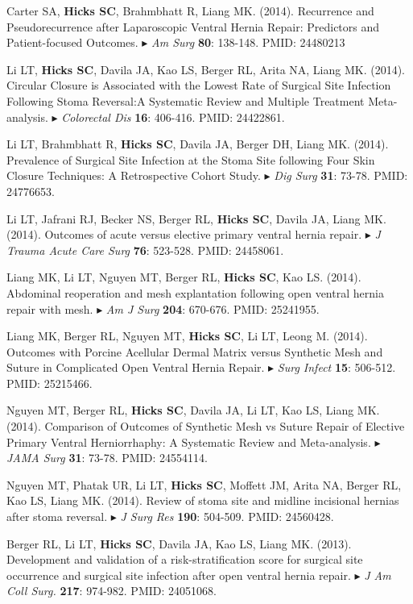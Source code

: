 \documentclass[10pt]{article}
\newcommand{\dg}[1]{{\color{black} $\blacktriangleright$ {#1}}}
\begin{document}
\item Carter SA, {\bf Hicks SC}, Brahmbhatt R, Liang MK. (2014). Recurrence and Pseudorecurrence after Laparoscopic Ventral Hernia Repair: Predictors and Patient-focused Outcomes. \dg{{\it Am Surg} {\bf 80}: 138-148. PMID: 24480213}
\item Li LT, {\bf Hicks SC}, Davila JA, Kao LS, Berger RL, Arita NA, Liang MK. (2014). Circular Closure is Associated with the Lowest Rate of Surgical Site Infection Following Stoma Reversal:A Systematic Review and Multiple Treatment Meta-analysis. \dg{{\it Colorectal Dis} {\bf 16}: 406-416. PMID: 24422861}.
\item Li LT, Brahmbhatt R, {\bf Hicks SC}, Davila JA, Berger DH, Liang MK. (2014). Prevalence of Surgical Site Infection at the Stoma Site following Four Skin Closure Techniques: A Retrospective Cohort Study. \dg{{\it Dig Surg} {\bf 31}: 73-78. PMID: 24776653}.
\item Li LT, Jafrani RJ, Becker NS, Berger RL,  {\bf Hicks SC}, Davila JA, Liang MK. (2014). Outcomes of acute versus elective primary ventral hernia repair. \dg{{\it J Trauma Acute Care Surg} {\bf 76}: 523-528. PMID: 24458061}.
\item Liang MK, Li LT, Nguyen MT, Berger RL, {\bf Hicks SC}, Kao LS. (2014). Abdominal reoperation and mesh explantation following open ventral hernia repair with mesh. \dg{{\it Am J Surg} {\bf 204}: 670-676. PMID: 25241955}.
\item Liang MK, Berger RL, Nguyen MT, {\bf Hicks SC}, Li LT, Leong M. (2014). Outcomes with Porcine Acellular Dermal Matrix versus Synthetic Mesh and Suture in Complicated Open Ventral Hernia Repair. \dg{{\it Surg Infect} {\bf 15}: 506-512. PMID: 25215466}.
\item Nguyen MT, Berger RL, {\bf Hicks SC}, Davila JA, Li LT, Kao LS, Liang MK. (2014). Comparison of Outcomes of Synthetic Mesh vs Suture Repair of Elective Primary Ventral Herniorrhaphy: A Systematic Review and Meta-analysis. \dg{{\it JAMA Surg} {\bf 31}: 73-78. PMID: 24554114}.
\item Nguyen MT, Phatak UR, Li LT, {\bf Hicks SC}, Moffett JM, Arita NA, Berger RL, Kao LS, Liang MK. (2014). Review of stoma site and midline incisional hernias after stoma reversal. \dg{{\it J Surg Res} {\bf 190}: 504-509. PMID: 24560428}.
\item Berger RL, Li LT, {\bf Hicks SC}, Davila JA, Kao LS, Liang MK. (2013). Development and validation of a risk-stratification score for surgical site occurrence and surgical site infection after open ventral hernia repair. \dg{{\it J Am Coll Surg.} {\bf 217}: 974-982. PMID: 24051068}.
\end{document}
